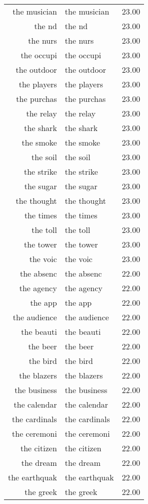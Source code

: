 \begin{table}[ht]
\begin{tabular}{rlr}
  the musician & the musician & 23.00 \\ 
  the nd & the nd & 23.00 \\ 
  the nurs & the nurs & 23.00 \\ 
  the occupi & the occupi & 23.00 \\ 
  the outdoor & the outdoor & 23.00 \\ 
  the players & the players & 23.00 \\ 
  the purchas & the purchas & 23.00 \\ 
  the relay & the relay & 23.00 \\ 
  the shark & the shark & 23.00 \\ 
  the smoke & the smoke & 23.00 \\ 
  the soil & the soil & 23.00 \\ 
  the strike & the strike & 23.00 \\ 
  the sugar & the sugar & 23.00 \\ 
  the thought & the thought & 23.00 \\ 
  the times & the times & 23.00 \\ 
  the toll & the toll & 23.00 \\ 
  the tower & the tower & 23.00 \\ 
  the voic & the voic & 23.00 \\ 
  the absenc & the absenc & 22.00 \\ 
  the agency & the agency & 22.00 \\ 
  the app & the app & 22.00 \\ 
  the audience & the audience & 22.00 \\ 
  the beauti & the beauti & 22.00 \\ 
  the beer & the beer & 22.00 \\ 
  the bird & the bird & 22.00 \\ 
  the blazers & the blazers & 22.00 \\ 
  the business & the business & 22.00 \\ 
  the calendar & the calendar & 22.00 \\ 
  the cardinals & the cardinals & 22.00 \\ 
  the ceremoni & the ceremoni & 22.00 \\ 
  the citizen & the citizen & 22.00 \\ 
  the dream & the dream & 22.00 \\ 
  the earthquak & the earthquak & 22.00 \\ 
  the greek & the greek & 22.00 \\ 

\end{tabular}
\end{table}
